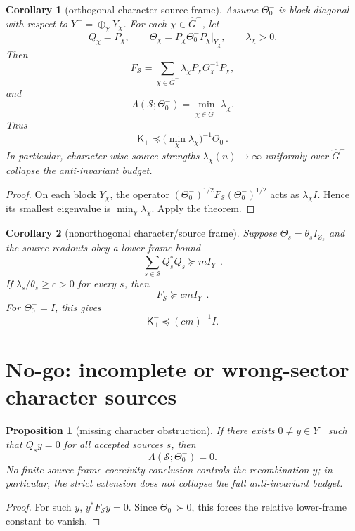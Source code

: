\documentclass[11pt]{article}
\newtheorem{proposition}{Proposition}
\newtheorem{corollary}{Corollary}
\begin{document}
\begin{corollary}[orthogonal character-source frame]
Assume \(\Theta^-_0\) is block diagonal with respect to \(Y^- =\oplus_\chi Y_\chi\).  For each \(\chi\in\widehat G^-\), let
\[
  Q_\chi=P_\chi,
  \qquad
  \Theta_\chi=P_\chi\Theta^-_0P_\chi|_{Y_\chi},
  \qquad
  \lambda_\chi>0.
\]
Then
\[
  F_{\mathcal S}=\sum_{\chi\in\widehat G^-}\lambda_\chi P_\chi\Theta_\chi^{-1}P_\chi,
\]
and
\[
  \Lambda(\mathcal S;\Theta^-_0)=\min_{\chi\in\widehat G^-}\lambda_\chi.
\]
Thus
\[
  \mathsf K^-_+\preceq
  \bigl(\min_\chi\lambda_\chi\bigr)^{-1}\Theta^-_0.
\]
In particular, character-wise source strengths \(\lambda_\chi(n)\to\infty\) uniformly over \(\widehat G^-\) collapse the anti-invariant budget.
\end{corollary}

\begin{proof}
On each block \(Y_\chi\), the operator \((\Theta^-_0)^{1/2}F_{\mathcal S}(\Theta^-_0)^{1/2}\) acts as \(\lambda_\chi I\).  Hence its smallest eigenvalue is \(\min_\chi\lambda_\chi\).  Apply the theorem.
\end{proof}

\begin{corollary}[nonorthogonal character/source frame]
Suppose \(\Theta_s=\theta_s I_{Z_s}\) and the source readouts obey a lower frame bound
\[
  \sum_{s\in\mathcal S}Q_s^*Q_s\succeq m I_{Y^-}.
\]
If \(\lambda_s/\theta_s\ge c>0\) for every \(s\), then
\[
  F_{\mathcal S}\succeq cm I_{Y^-}.
\]
For \(\Theta^-_0=I\), this gives
\[
  \mathsf K^-_+\preceq (cm)^{-1}I.
\]
\end{corollary}

\section{No-go: incomplete or wrong-sector character sources}
\begin{proposition}[missing character obstruction]
If there exists \(0\ne y\in Y^-\) such that \(Q_sy=0\) for all accepted sources \(s\), then
\[
  \Lambda(\mathcal S;\Theta^-_0)=0.
\]
No finite source-frame coercivity conclusion controls the recombination \(y\); in particular, the strict extension does not collapse the full anti-invariant budget.
\end{proposition}

\begin{proof}
For such \(y\), \(y^*F_{\mathcal S}y=0\).  Since \(\Theta^-_0\succ0\), this forces the relative lower-frame constant to vanish.
\end{proof}
\end{document}
